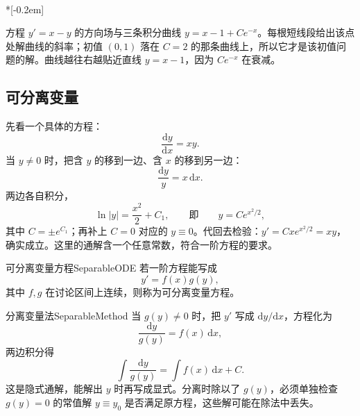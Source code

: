 \begin{center}
\\*[-0.2em]
\parbox{0.86\linewidth}{\centering\footnotesize
方程 $y'=x-y$ 的方向场与三条积分曲线 $y=x-1+Ce^{-x}$。每根短线段给出该点处解曲线的斜率；初值 $(0,1)$ 落在 $C=2$ 的那条曲线上，所以它才是该初值问题的解。曲线越往右越贴近直线 $y=x-1$，因为 $Ce^{-x}$ 在衰减。}
\end{center}

\subsection{可分离变量}

先看一个具体的方程：
\[
  \frac{\mathrm{d}y}{\mathrm{d}x}=xy.
\]
当 $y\ne0$ 时，把含 $y$ 的移到一边、含 $x$ 的移到另一边：
\[
  \frac{\mathrm{d}y}{y}=x\,\mathrm{d}x.
\]
两边各自积分，
\[
  \ln|y|=\frac{x^2}{2}+C_1,
  \qquad\text{即}\qquad
  y=Ce^{x^2/2},
\]
其中 $C=\pm e^{C_1}$；再补上 $C=0$ 对应的 $y\equiv0$。代回去检验：$y'=Cxe^{x^2/2}=xy$，确实成立。这里的通解含一个任意常数，符合一阶方程的要求。

\begin{mydef}{可分离变量方程}{SeparableODE}
若一阶方程能写成
\[
  y'=f(x)g(y),
\]
其中 $f,g$ 在讨论区间上连续，则称为可分离变量方程。
\end{mydef}

\begin{conclusion}{分离变量法}{SeparableMethod}
当 $g(y)\ne0$ 时，把 $y'$ 写成 $\mathrm{d}y/\mathrm{d}x$，方程化为
\[
  \frac{\mathrm{d}y}{g(y)}=f(x)\,\mathrm{d}x,
\]
两边积分得
\[
  \int\frac{\mathrm{d}y}{g(y)}=\int f(x)\,\mathrm{d}x+C.
\]
这是隐式通解，能解出 $y$ 时再写成显式。分离时除以了 $g(y)$，必须单独检查 $g(y)=0$ 的常值解 $y\equiv y_0$ 是否满足原方程，这些解可能在除法中丢失。
\end{conclusion}


